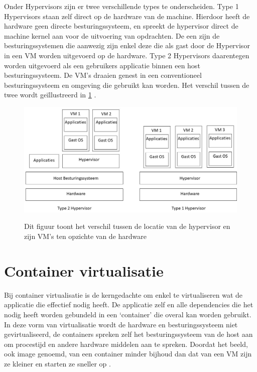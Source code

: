 Onder Hypervisors zijn er twee verschillende  types te onderscheiden. Type 1 Hypervisors staan zelf direct op de hardware van de machine. Hierdoor heeft de hardware geen directe besturingssysteem, en spreekt de hypervisor direct de machine kernel aan voor de uitvoering van opdrachten. De  een zijn de besturingssystemen die aanwezig zijn enkel deze die als gast door de Hypervisor in een VM worden uitgevoerd op de hardware. Type 2 Hypervisors daarentegen worden uitgevoerd als een gebruikers applicatie binnen een host besturingssysteem.  De VM’s draaien genest in een conventioneel besturingssysteem en omgeving die gebruikt kan worden. Het verschil tussen de twee wordt geïllustreerd in \ref{fig:hyperviors} \autocite{Yadav2018,Eder2016}.

\begin{figure}[h]
    \includegraphics[width=\linewidth]{img/hypervisors.jpg}
    \label{fig:hyperviors}
    \caption[Verschil tussen type 1 en type 2 hypervisor]{Dit figuur toont het verschil tussen de locatie van de hypervisor en zijn VM’s ten opzichte van de hardware }
    \centering
\end{figure}

\section{Container virtualisatie}

Bij container virtualisatie is de kerngedachte om enkel te virtualiseren wat de applicatie die effectief nodig heeft. De applicatie zelf en alle dependencies die het nodig heeft worden gebundeld in een ‘container’ die overal kan worden gebruikt. In deze vorm van virtualisatie wordt de hardware en besturingssysteem niet gevirtualiseerd, de containers spreken zelf het besturingssysteem van de host aan om procestijd en andere hardware middelen aan te spreken. Doordat het beeld, ook image genoemd, van een container minder bijhoud dan dat van een VM zijn ze kleiner en starten ze sneller op \autocite{Eder2016,Jangla2018}.


